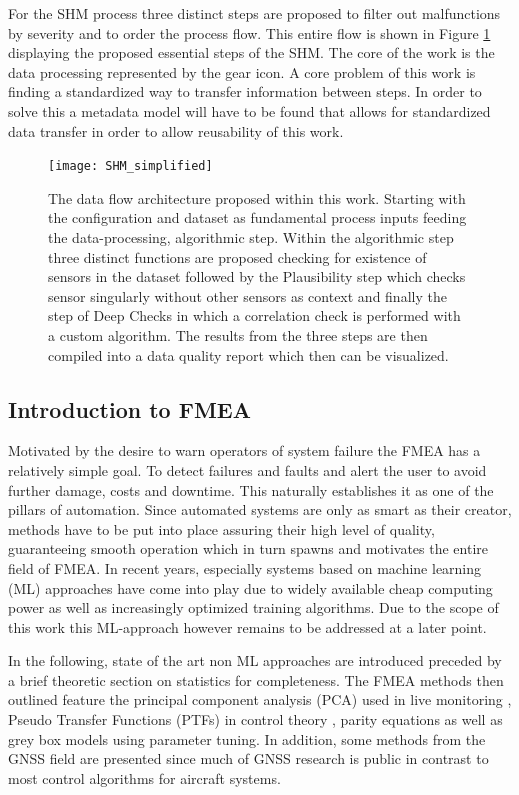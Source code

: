 For the SHM process three distinct steps are proposed to filter out malfunctions by severity and to order the process flow. This entire flow is shown in Figure \ref{fig:SHM_simplified} displaying the proposed essential steps of the SHM. The core of the work is the data processing represented by the gear icon. A core problem of this work is finding a standardized way to transfer information between steps. In order to solve this a metadata model will have to be found that allows for standardized data transfer in order to allow reusability of this work.
\begin{figure}[!h]
    \centering
    \texttt{[image: SHM\_simplified]}
    \caption[The general, proposed SHM Architecture]{The data flow architecture proposed within this work. Starting with the configuration and dataset as fundamental process inputs feeding the data-processing, algorithmic step. Within the algorithmic step three distinct functions are proposed checking for existence of sensors in the dataset followed by the Plausibility step which checks sensor singularly without other sensors as context and finally the step of Deep Checks in which a correlation check is performed with a custom algorithm. The results from the three steps are then compiled into a data quality report which then can be visualized.}
    \label{fig:SHM_simplified}
\end{figure}

\subsection{Introduction to FMEA}

Motivated by the desire to warn operators of system failure the FMEA has a relatively simple goal. To detect failures and faults and alert the user to avoid further damage, costs and downtime. This naturally establishes it as one of the pillars of automation. \cite{isermann_fault-diagnosis_2006} Since automated systems are only as smart as their creator, methods have to be put into place assuring their high level of quality, guaranteeing smooth operation which in turn spawns and motivates the entire field of FMEA. In recent years, especially systems based on machine learning (ML) approaches have come into play due to widely available cheap computing power as well as increasingly optimized training algorithms. Due to the scope of this work this ML-approach however remains to be addressed at a later point.


In the following, state of the art non ML approaches are introduced preceded by a brief theoretic section on statistics for completeness. The FMEA methods then outlined feature the principal component analysis (PCA) used in live monitoring \cite{xiao_diagnostic_2006}, Pseudo Transfer Functions (PTFs) in control theory \cite{aljanaideh_aircraft_2015}, parity equations as well as grey box models using parameter tuning. \cite{isermann_fault-diagnosis_2006} In addition, some methods from the GNSS field are presented since much of GNSS research is public in contrast to most control algorithms for aircraft systems.

